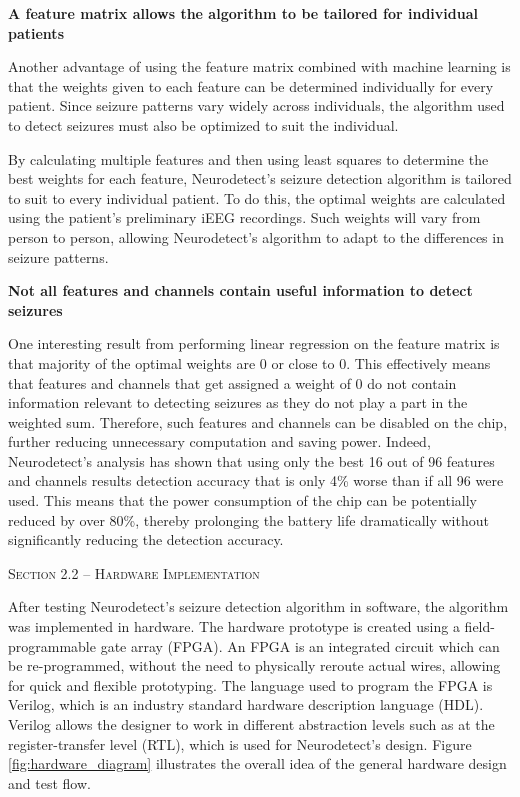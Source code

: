 \documentclass[usletter, 11pt]{extarticle}
\begin{document}
\vspace{11pt}
\textbf{A feature matrix allows the algorithm to be tailored for individual patients}

Another advantage of using the feature matrix combined with machine learning is that the weights given to each feature can be determined individually for every patient. Since seizure patterns vary widely across individuals, the algorithm used to detect seizures must also be optimized to suit the individual.

By calculating multiple features and then using least squares to determine the best weights for each feature, Neurodetect's seizure detection algorithm is tailored to suit to every individual patient. To do this, the optimal weights are calculated using the patient’s preliminary iEEG recordings. Such weights will vary from person to person, allowing Neurodetect's algorithm to adapt to the differences in seizure patterns.

\vspace{11pt}
\vspace{11pt}
\textbf{Not all features and channels contain useful information to detect seizures}

One interesting result from performing linear regression on the feature matrix is that majority of the optimal weights are 0 or close to 0. This effectively means that features and channels that get assigned a weight of 0 do not contain information relevant to detecting seizures as they do not play a part in the weighted sum. Therefore, such features and channels can be disabled on the chip, further reducing unnecessary computation and saving power. Indeed, Neurodetect's analysis has shown that using only the best 16 out of 96 features and channels results detection accuracy that is only 4\% worse than if all 96 were used. This means that the power consumption of the chip can be potentially reduced by over 80\%, thereby prolonging the battery life dramatically without significantly reducing the detection accuracy.

\clearpage
\textsc{Section 2.2 – Hardware Implementation}
\vspace{11pt}

After testing Neurodetect's seizure detection algorithm in software, the algorithm was implemented in hardware. The hardware prototype is created using a field-programmable gate array (FPGA). An FPGA is an integrated circuit which can be re-programmed, without the need to physically reroute actual wires, allowing for quick and flexible prototyping. The language used to program the FPGA is Verilog, which is an industry standard hardware description language (HDL). Verilog allows the designer to work in different abstraction levels such as at the register-transfer level (RTL), which is used for Neurodetect's design. Figure \ref{fig:hardware_diagram} illustrates the overall idea of the general hardware design and test flow.
\end{document}
